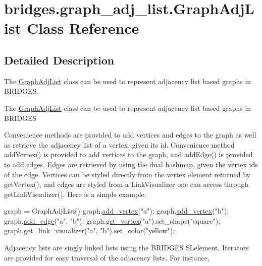 \hypertarget{classbridges_1_1graph__adj__list_1_1_graph_adj_list}{}\section{bridges.\+graph\+\_\+adj\+\_\+list.\+Graph\+Adj\+List Class Reference}
\label{classbridges_1_1graph__adj__list_1_1_graph_adj_list}


\subsection{Detailed Description}
The \hyperlink{classbridges_1_1graph__adj__list_1_1_graph_adj_list}{Graph\+Adj\+List} class can be used to represent adjacency list based graphs in B\+R\+I\+D\+G\+ES. 

The \hyperlink{classbridges_1_1graph__adj__list_1_1_graph_adj_list}{Graph\+Adj\+List} class can be used to represent adjacency list based graphs in B\+R\+I\+D\+G\+ES

Convenience methods are provided to add vertices and edges to the graph as well as retrieve the adjacency list of a vertex, given its id. Convenience method add\+Vertex() is provided to add vertices to the graph, and add\+Edge() is provided to add edges. Edges are retrieved by using the dual hashmap, given the vertex ids of the edge. Vertices can be styled directly from the vertex element returned by get\+Vertex(), and edges are styled from a Link\+Visualizer one can access through get\+Link\+Visualizer(). Here is a simple example\+:


\begin{DoxyCode}
graph = GraphAdjList()
graph.\hyperlink{classbridges_1_1graph__adj__list_1_1_graph_adj_list_a61f1ad2a4f358a1e5137c189ba2b1de7}{add\_vertex}("a");
graph.\hyperlink{classbridges_1_1graph__adj__list_1_1_graph_adj_list_a61f1ad2a4f358a1e5137c189ba2b1de7}{add\_vertex}("b");
graph.\hyperlink{classbridges_1_1graph__adj__list_1_1_graph_adj_list_a20a8e0801a34cce09ed429c58c1d851a}{add\_edge}("a", "b");
graph.\hyperlink{classbridges_1_1graph__adj__list_1_1_graph_adj_list_af484d881d91177e723faf8b8a5c427e2}{get\_vertex}("a").set\_shape("square");
graph.\hyperlink{classbridges_1_1graph__adj__list_1_1_graph_adj_list_abaa3015ae78e0f5ebc6fd2d2d2772927}{get\_link\_visualizer}("a", "b").set\_color("yellow");
\end{DoxyCode}


Adjacency lists are singly linked lists using the B\+R\+I\+D\+G\+ES S\+Lelement. Iterators are provided for easy traversal of the adjacency lists. For instance,


